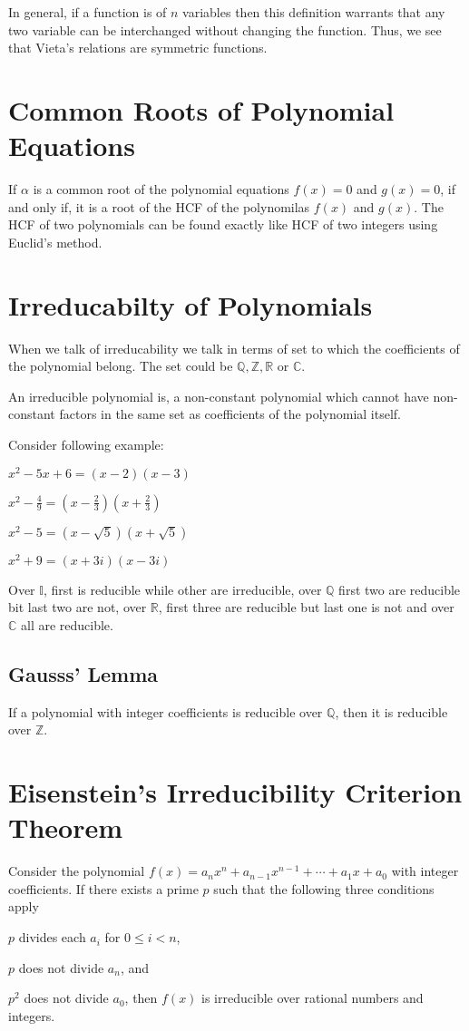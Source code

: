 In general, if a function is of $n$ variables then this definition warrants that any two variable can be
interchanged without changing the function. Thus, we see that Vieta's relations are symmetric functions.

\section{Common Roots of Polynomial Equations}
If $\alpha$ is a common root of the polynomial equations $f(x) = 0$ and $g(x) = 0$, if and only if, it is a
root of the HCF of the polynomilas $f(x)$ and $g(x)$. The HCF of two polynomials can be found exactly like
HCF of two integers using Euclid's method.

\section{Irreducabilty of Polynomials}
When we talk of irreducability we talk in terms of set to which the coefficients of the polynomial
belong. The set could be $\mathbb{Q}, \mathbb{Z}, \mathbb{R}$ or $\mathbb{C}$.

An irreducible polynomial is, a non-constant polynomial which cannot have non-constant factors in the same
set as coefficients of the polynomial itself.

Consider following example:

\startitemize[n]
\item $x^2 - 5x + 6 = (x - 2)(x - 3)$
\item $x^2 - \frac{4}{9} = \left(x - \frac{2}{3}\right)\left(x + \frac{2}{3}\right)$
\item $x^2 - 5 = (x - \sqrt{5})(x + \sqrt{5})$
\item $x^2 + 9 = (x + 3i)(x - 3i)$
\stopitemize

Over $\mathbb{I}$, first is reducible while other are irreducible, over $\mathbb{Q}$ first two are reducible
bit last two are not, over $\mathbb{R}$, first three are reducible but last one is not and over $\mathbb{C}$
all are reducible.

\subsection{Gausss' Lemma}
If a polynomial with integer coefficients is reducible over $\mathbb{Q}$, then it is reducible over
$\mathbb{Z}$.

\section{Eisenstein's Irreducibility Criterion Theorem}
\starttheorem
Consider the polynomial $f(x) = a_nx^n + a_{n - 1}x^{n - 1} + \cdots + a_1x + a_0$ with integer
coefficients. If there exists a prime $p$ such that the following three conditions apply
\startitemize[n]
\item $p$ divides each $a_i$ for $0\leq i < n$,
\item $p$ does not divide $a_n$, and
\item $p^2$ does not divide $a_0$,
\stopitemize
then $f(x)$ is irreducible over rational numbers and integers.
\stoptheorem

